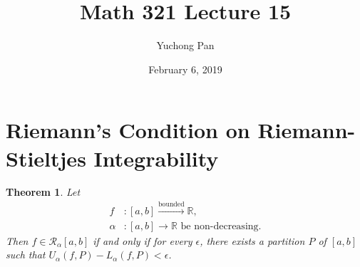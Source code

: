 \documentclass[letterpaper, reqno,11pt]{article}
\newcommand{\RR}{\mathbb{R}}
\begin{document}
\title{Math 321 Lecture 15}
\author{Yuchong Pan}
\date{February 6, 2019}
\newtheorem{thm}{Theorem}
\newtheorem{defn}{Definition}
\newtheorem*{remark}{Remark}
\newtheorem{claim}{Claim}
\newtheorem{cor}{Corollary}
\newtheorem{lemma}{Lemma}
\newtheorem{prop}{Proposition}
\maketitle
%

\section{Riemann's Condition on Riemann-Stieltjes Integrability}

\begin{thm}
  \normalfont Let
  \begin{align*}
    f &: [a, b] \xrightarrow{\text{bounded}} \RR, \\
    \alpha &: [a, b] \to \RR \text{ be non-decreasing}.
  \end{align*}
  Then $f \in \mathcal R_\alpha[a, b]$ if and only if for every $\epsilon$, there exists a partition $P$ of $[a, b]$ such that $U_\alpha(f, P) - L_\alpha(f, P) < \epsilon$.
\end{thm}
\end{document}

